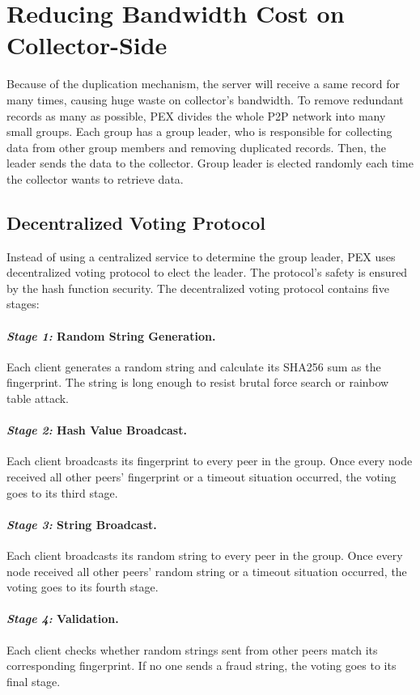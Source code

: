 \documentclass[twocolumn]{article}
\begin{document}
\section{Reducing Bandwidth Cost on Collector-Side}
Because of the duplication mechanism, the server will receive a same record for many times, causing huge waste on collector's bandwidth. To remove redundant records as many as possible, PEX divides the whole P2P network into many small groups. Each group has a group leader, who is responsible for collecting data from other group members and removing duplicated records. Then, the leader sends the data to the collector. Group leader is elected randomly each time the collector wants to retrieve data.

\subsection{Decentralized Voting Protocol}
Instead of using a centralized service to determine the group leader, PEX uses decentralized voting protocol to elect the leader. The protocol's safety is ensured by the hash function security. The decentralized voting protocol contains five stages:
\paragraph{\textit{Stage 1:} Random String Generation.} Each client generates a random string and calculate its SHA256 sum as the fingerprint. The string is long enough to resist brutal force search or rainbow table attack.
\paragraph{\textit{Stage 2:} Hash Value Broadcast.} Each client broadcasts its fingerprint to every peer in the group. Once every node received all other peers' fingerprint or a timeout situation occurred, the voting goes to its third stage.
\paragraph{\textit{Stage 3:} String Broadcast.} Each client broadcasts its random string to every peer in the group. Once every node received all other peers' random string or a timeout situation occurred, the voting goes to its fourth stage.
\paragraph{\textit{Stage 4:} Validation.} Each client checks whether random strings sent from other peers match its corresponding fingerprint. If no one sends a fraud string, the voting goes to its final stage.
\end{document}

